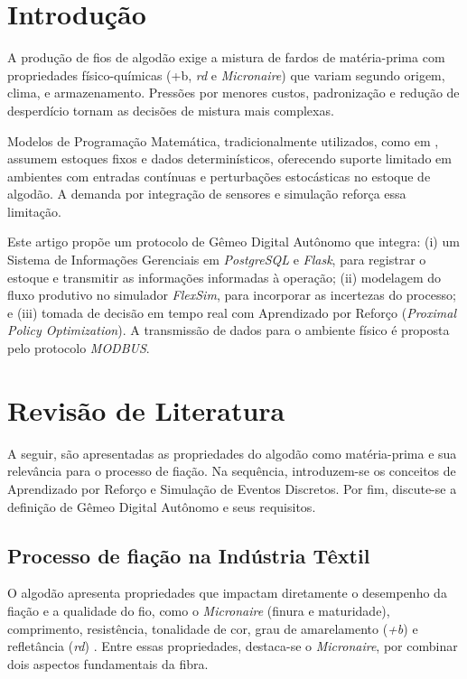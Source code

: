 \documentclass[a4paper,12pt]{article}
\begin{document}
\onehalfspacing
\justifying
\setlength{\parindent}{0pt}

\section{Introdução}

A produção de fios de algodão exige a mistura de fardos de matéria-prima com propriedades físico-químicas (\mbox{+b}, \textit{rd} e \textit{Micronaire}) que variam segundo origem, clima, e armazenamento. Pressões por menores custos, padronização e redução de desperdício tornam as decisões de mistura mais complexas.

Modelos de Programação Matemática, tradicionalmente utilizados, como em \cite{greene_cotton_blending_1965}, assumem estoques fixos e dados determinísticos, oferecendo suporte limitado em ambientes com entradas contínuas e perturbações estocásticas \cite{takahashi_2016} no estoque de algodão. A demanda por integração de sensores e simulação reforça essa limitação.

Este artigo propõe um protocolo de Gêmeo Digital Autônomo que integra: (i) um Sistema de Informações Gerenciais em \textit{PostgreSQL} e \textit{Flask}, para registrar o estoque e transmitir as informações informadas à operação; (ii) modelagem do fluxo produtivo no simulador \textit{FlexSim}, para incorporar as incertezas do processo; e (iii) tomada de decisão em tempo real com Aprendizado por Reforço (\textit{Proximal Policy Optimization}). A transmissão de dados para o ambiente físico é proposta pelo protocolo \textit{MODBUS}.

\section{Revisão de Literatura}

A seguir, são apresentadas as propriedades do algodão como matéria-prima e sua relevância para o processo de fiação. Na sequência, introduzem-se os conceitos de Aprendizado por Reforço e Simulação de Eventos Discretos. Por fim, discute-se a definição de Gêmeo Digital Autônomo e seus requisitos.

\subsection{Processo de fiação na Indústria Têxtil}

O algodão apresenta propriedades que impactam diretamente o desempenho da fiação e a qualidade do fio, como o \textit{Micronaire} (finura e maturidade), comprimento, resistência, tonalidade de cor, grau de amarelamento (\textit{+b}) e refletância (\textit{rd}) \cite{waters_effect_1961, fang_physical_2018}. Entre essas propriedades, destaca-se o \textit{Micronaire}, por combinar dois aspectos fundamentais da fibra.
\end{document}
